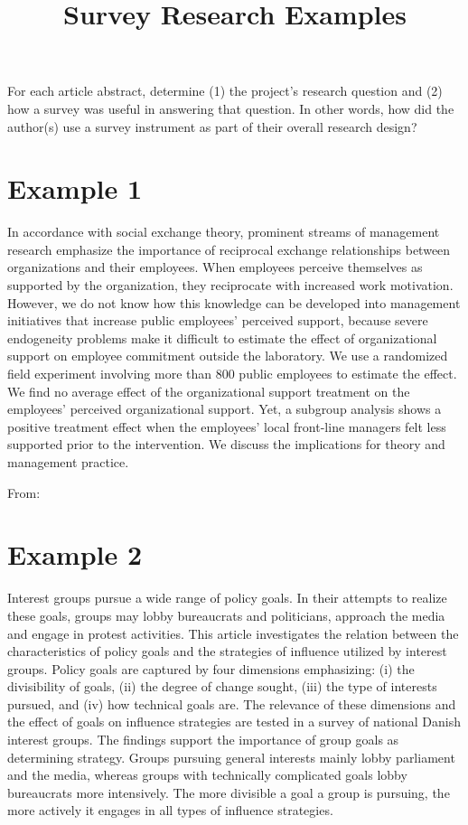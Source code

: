 \documentclass[a4, 12pt]{article}
\title{Survey Research Examples}
\author{}
\date{}
\begin{document}
\maketitle
\nobibliography*

\noindent For each article abstract, determine (1) the project's research question and (2) how a survey was useful in answering that question. In other words, how did the author(s) use a survey instrument as part of their overall research design?

\section*{Example 1}

In accordance with social exchange theory, prominent streams of management research emphasize the importance of reciprocal exchange relationships between organizations and their employees. When employees perceive themselves as supported by the organization, they reciprocate with increased work motivation. However, we do not know how this knowledge can be developed into management initiatives that increase public employees' perceived support, because severe endogeneity problems make it difficult to estimate the effect of organizational support on employee commitment outside the laboratory. We use a randomized field experiment involving more than 800 public employees to estimate the effect. We find no average effect of the organizational support treatment on the employees' perceived organizational support. Yet, a subgroup analysis shows a positive treatment effect when the employees' local front-line managers felt less supported prior to the intervention. We discuss the implications for theory and management practice.

\vspace{1em}\noindent From: 

\section*{Example 2}

Interest groups pursue a wide range of policy goals. In their attempts to realize these goals, groups may lobby bureaucrats and politicians, approach the media and engage in protest activities. This article investigates the relation between the characteristics of policy goals and the strategies of influence utilized by interest groups. Policy goals are captured by four dimensions emphasizing: (i) the divisibility of goals, (ii) the degree of change sought, (iii) the type of interests pursued, and (iv) how technical goals are. The relevance of these dimensions and the effect of goals on influence strategies are tested in a survey of national Danish interest groups. The findings support the importance of group goals as determining strategy. Groups pursuing general interests mainly lobby parliament and the media, whereas groups with technically complicated goals lobby bureaucrats more intensively. The more divisible a goal a group is pursuing, the more actively it engages in all types of influence strategies.
\end{document}
